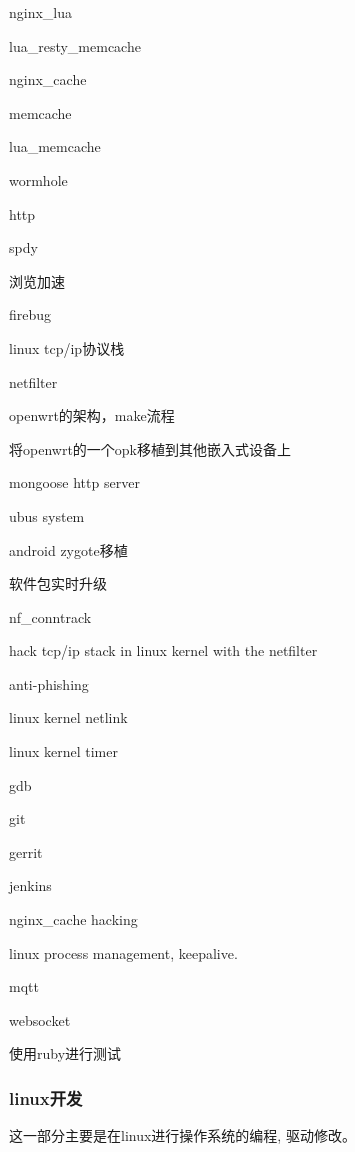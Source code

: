 \documentclass[titlepage]{article}
\begin{document}
\begin{compactitem}
    \item nginx\_lua 
    \item lua\_resty\_memcache 
    \item nginx\_cache 
    \item memcache 
    \item lua\_memcache
    \item wormhole 
    \item http 
    \item spdy 
    \item 浏览加速
    \item firebug 
    \item linux tcp/ip协议栈
    \item netfilter
    \item openwrt的架构，make流程
    \item 将openwrt的一个opk移植到其他嵌入式设备上
    \item mongoose http server
    \item ubus system
    \item android zygote移植
    \item 软件包实时升级
    \item nf\_conntrack
    \item hack tcp/ip stack in linux kernel with the  netfilter
    \item anti-phishing
    \item linux kernel netlink
    \item linux kernel timer
    \item gdb 
    \item git 
    \item gerrit
    \item jenkins
    \item nginx\_cache hacking
    \item linux process management, keepalive.
    \item mqtt
    \item websocket
    \item 使用ruby进行测试
\end{compactitem}



\subsubsection{linux开发}

这一部分主要是在linux进行操作系统的编程, 驱动修改。
\end{document}
